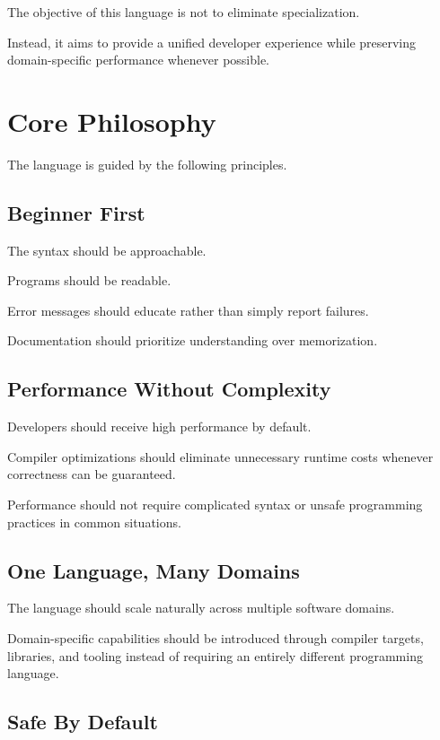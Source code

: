 \documentclass[12pt]{article}
\begin{document}
The objective of this language is not to eliminate specialization.

Instead, it aims to provide a unified developer experience while preserving domain-specific performance whenever possible.


\section{Core Philosophy}

The language is guided by the following principles.

\subsection{Beginner First}

The syntax should be approachable.

Programs should be readable.

Error messages should educate rather than simply report failures.

Documentation should prioritize understanding over memorization.

\subsection{Performance Without Complexity}

Developers should receive high performance by default.

Compiler optimizations should eliminate unnecessary runtime costs whenever correctness can be guaranteed.

Performance should not require complicated syntax or unsafe programming practices in common situations.

\subsection{One Language, Many Domains}

The language should scale naturally across multiple software domains.

Domain-specific capabilities should be introduced through compiler targets, libraries, and tooling instead of requiring an entirely different programming language.

\subsection{Safe By Default}
\end{document}
